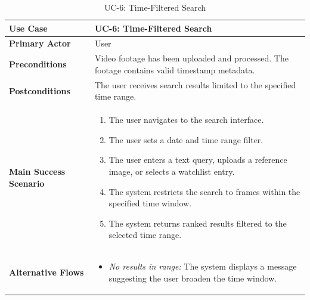 \begin{table}[H]
\centering
\begin{tabular}{|l|p{10cm}|}
\hline
\textbf{Use Case}       & UC-6: Time-Filtered Search \\ \hline
\textbf{Primary Actor}   & User \\ \hline
\textbf{Preconditions}   & Video footage has been uploaded and processed. The footage contains valid timestamp metadata. \\ \hline
\textbf{Postconditions}  & The user receives search results limited to the specified time range. \\ \hline
\textbf{Main Success Scenario} &
    \begin{enumerate}[nosep, leftmargin=*]
        \item The user navigates to the search interface.
        \item The user sets a date and time range filter.
        \item The user enters a text query, uploads a reference image, or selects a watchlist entry.
        \item The system restricts the search to frames within the specified time window.
        \item The system returns ranked results filtered to the selected time range.
    \end{enumerate} \\ \hline
\textbf{Alternative Flows} &
    \begin{itemize}[nosep, leftmargin=*]
        \item \textit{No results in range:} The system displays a message suggesting the user broaden the time window.
    \end{itemize} \\ \hline
\end{tabular}
\caption{UC-6: Time-Filtered Search}
\label{tab:uc6}
\end{table}

